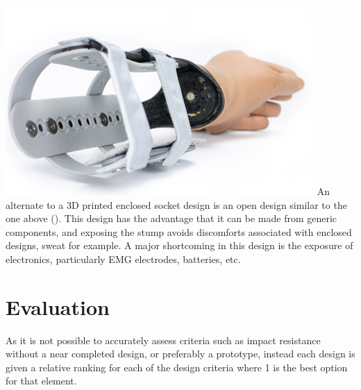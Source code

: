 \documentclass[11pt,3p]{report}
\begin{document}
\begin{multicols}{2}
		\includegraphics[scale=0.8]{open_socket.PNG}
		An alternate to a 3D printed enclosed socket design is an open design similar to the one above (\cite{martin}). This design has the advantage that it can be made from generic components, and exposing the stump avoids discomforts associated with enclosed designs, sweat for example. A major shortcoming in this design is the exposure of electronics, particularly EMG electrodes, batteries, etc. 
		

\newpage

\end{multicols}	
	\section{Evaluation}
As it is not possible to accurately assess criteria such as impact resistance without a near completed design, or preferably a prototype, instead each design is given a relative ranking for each of the design criteria where 1 is the best option for that element.
\end{document}
